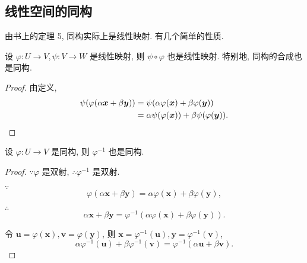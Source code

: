\documentclass[color=black,device=normal,lang=cn,mode=geye]{elegantnote}
\begin{document}
\subsection{线性空间的同构}
由书上的定理 5, 同构实际上是线性映射. 有几个简单的性质.
\begin{property}
    设 $\varphi:U\to V,\psi:V\to W$ 是线性映射, 则 $\psi\circ\varphi$ 也是线性映射. 特别地, 同构的合成也是同构.
\end{property}
\begin{proof}
    由定义,
    \begin{align*}
        \psi(\varphi(\alpha\boldsymbol{x}+\beta\boldsymbol{y})) & =\psi(\alpha\varphi(\boldsymbol{x})+\beta\varphi(\boldsymbol{y})) \\
        & =\alpha\psi(\varphi(\boldsymbol{x}))+\beta\psi(\varphi(\boldsymbol{y})).\qedhere
    \end{align*}
\end{proof}
\begin{property}
    设 $\varphi:U\to V$ 是同构, 则 $\varphi^{-1}$ 也是同构.
\end{property}
\begin{proof}
    $\because\varphi$ 是双射, $\therefore\varphi^{-1}$ 是双射.

    $\because$
    \[\varphi(\alpha\boldsymbol{x}+\beta\boldsymbol{y})=\alpha\varphi(\boldsymbol{x})+\beta\varphi(\boldsymbol{y}),\]

    $\therefore$
    \[\alpha\boldsymbol{x}+\beta\boldsymbol{y}=\varphi^{-1}(\alpha\varphi(\boldsymbol{x})+\beta\varphi(\boldsymbol{y})).\]

    令 $\boldsymbol{u}=\varphi(\boldsymbol{x}),\boldsymbol{v}=\varphi(\boldsymbol{y})$, 则 $\boldsymbol{x}=\varphi^{-1}(\boldsymbol{u}),\boldsymbol{y}=\varphi^{-1}(\boldsymbol{v})$,
    \[\alpha\varphi^{-1}(\boldsymbol{u})+\beta\varphi^{-1}(\boldsymbol{v})=\varphi^{-1}(\alpha\boldsymbol{u}+\beta\boldsymbol{v}).\]
\end{proof}
\end{document}
